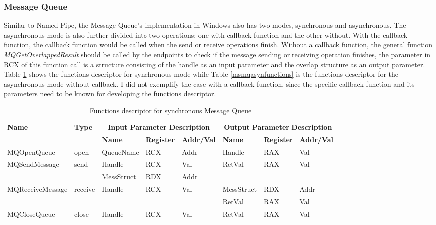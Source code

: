 \documentclass[12pt,oneside]{book}
\begin{document}
\subsubsection{Message Queue}
Similar to Named Pipe, the Message Queue's implementation in Windows also has two modes, synchronous and asynchronous. The asynchronous mode is also further divided into two operations: one with callback function and the other without. With the callback function, the callback function would be called when the send or receive operations finish. Without a callback function, the general function \textit{MQGetOverlappedResult} should be called by the endpoints to check if the message sending or receiving operation finishes, the parameter in RCX of this function call is a structure consisting of the handle as an input parameter and the overlap structure as an output parameter. Table \ref{msmqsynfunctions} shows the functions descriptor for synchronous mode while Table \ref{msmqasynfunctions} is the functions descriptor for the asynchronous mode without callback. I did not exemplify the case with a callback function, since the specific callback function and its parameters need to be known for developing the functions descriptor.

\begin{table}[H]
  \centering
  \caption{Functions descriptor for synchronous Message Queue}
  \label{msmqsynfunctions}
\begin{tabular}{|l|l|l|l|l|l|l|l|}
\hline
             \multirow{2}{*}{{\textbf{Name}}} & \multirow{2}{*}{{\textbf{Type}}} & \multicolumn{3}{c|}{\textbf{Input Parameter Description}} & \multicolumn{3}{c|}{\textbf{Output Parameter Description}} \\
              \cline{3-8} 
             & & \textbf{Name}& \textbf{Register} & \textbf{Addr/Val} & \textbf{Name}& \textbf{Register} &  \textbf{Addr/Val}  \\
             \hline
      MQOpenQueue
       &open & QueueName & RCX  & Addr &  Handle & RAX & Val\\
      \hline                     
      \multirow{2}{*}{MQSendMessage}
       &\multirow{2}{*}{send} &  Handle & RCX & Val & \multirow{2}{*}{RetVal} & \multirow{2}{*}{RAX}  & \multirow{2}{*}{Val} \\
       \cline{3-5}
      & & MessStruct& RDX&Addr &   &  &  \\
      \hline            
      \multirow{2}{*}{MQReceiveMessage}
       &\multirow{2}{*}{receive}&  \multirow{2}{*}{Handle} & \multirow{2}{*}{RCX} & \multirow{2}{*}{Val}& MessStruct& RDX&Addr\\
              \cline{6-8}
      & & & & & RetVal & RAX & Val\\
      \hline       
      MQCloseQueue &
       close &  Handle & RCX & Val & RetVal & RAX & Val\\
      \hline                          
  \end{tabular}   
\end{table}
\end{document}
